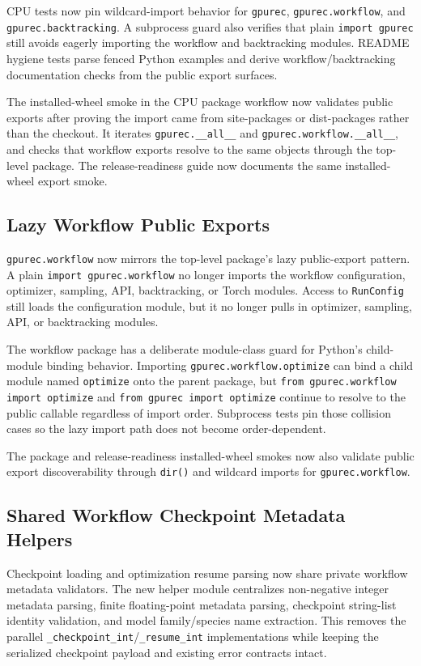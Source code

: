 \documentclass[11pt]{article}
\begin{document}
CPU tests now pin wildcard-import behavior for \texttt{gpurec},
\texttt{gpurec.workflow}, and \texttt{gpurec.backtracking}.  A subprocess guard
also verifies that plain \texttt{import gpurec} still avoids eagerly importing
the workflow and backtracking modules.  README hygiene tests parse fenced Python
examples and derive workflow/backtracking documentation checks from the public
export surfaces.

The installed-wheel smoke in the CPU package workflow now validates public
exports after proving the import came from site-packages or dist-packages rather
than the checkout.  It iterates \texttt{gpurec.\_\_all\_\_} and
\texttt{gpurec.workflow.\_\_all\_\_}, and checks that workflow exports resolve to
the same objects through the top-level package.  The release-readiness guide now
documents the same installed-wheel export smoke.

\subsection{Lazy Workflow Public Exports}

\texttt{gpurec.workflow} now mirrors the top-level package's lazy public-export
pattern.  A plain \texttt{import gpurec.workflow} no longer imports the workflow
configuration, optimizer, sampling, API, backtracking, or Torch modules.  Access
to \texttt{RunConfig} still loads the configuration module, but it no longer
pulls in optimizer, sampling, API, or backtracking modules.

The workflow package has a deliberate module-class guard for Python's
child-module binding behavior.  Importing \texttt{gpurec.workflow.optimize} can
bind a child module named \texttt{optimize} onto the parent package, but
\texttt{from gpurec.workflow import optimize} and
\texttt{from gpurec import optimize} continue to resolve to the public callable
regardless of import order.  Subprocess tests pin those collision cases so the
lazy import path does not become order-dependent.

The package and release-readiness installed-wheel smokes now also validate
public export discoverability through \texttt{dir()} and wildcard imports for
\texttt{gpurec.workflow}.

\subsection{Shared Workflow Checkpoint Metadata Helpers}

Checkpoint loading and optimization resume parsing now share private workflow
metadata validators.  The new helper module centralizes non-negative integer
metadata parsing, finite floating-point metadata parsing, checkpoint string-list
identity validation, and model family/species name extraction.  This removes the
parallel \texttt{\_checkpoint\_int}/\texttt{\_resume\_int} implementations while
keeping the serialized checkpoint payload and existing error contracts intact.
\end{document}
